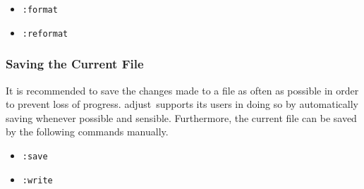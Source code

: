 \documentclass[11pt, a4paper, british]{scrartcl}
\DeclareRobustCommand{\adjust}{\textsf{adjust}}
\begin{document}
\begin{itemize}
\item \texttt{:format}
\item \texttt{:reformat}
\end{itemize}

\subsubsection{Saving the Current File}
\label{sec:saving-the-current-file}
It is recommended to save the changes made to a file as often as possible in
order to prevent loss of progress.  \adjust\ supports its users in doing so by
automatically saving whenever possible and sensible.  Furthermore, the current
file can be saved by the following commands manually.

\begin{itemize}
\item \texttt{:save}
\item \texttt{:write}
\end{itemize}

\end{document}

